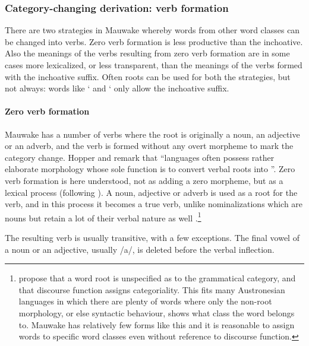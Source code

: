 \subsubsection{Category-changing derivation: verb formation}\label{sec:3.8.2.2}
{}
There are two strategies in Mauwake whereby words from other word classes can be changed into verbs. Zero verb formation is less productive than the inchoative. Also the meanings of the verbs resulting from zero verb formation are in some cases more lexicalized, or less transparent, than the meanings of the verbs formed with the inchoative suffix. Often roots can be used for both the strategies, but not always: words like  ` and  ` only allow the inchoative suffix.

\paragraph{Zero verb formation}\label{sec:3.8.2.2.1}
{}
Mauwake has a number of verbs where the root is originally a noun, an adjective or an adverb, and the verb is formed without any overt morpheme to mark the category change. Hopper and \citet[745]{Thompson1984} remark that ``{languages often possess rather elaborate morphology whose sole function is to convert verbal roots into}  ''. Zero verb formation is here understood, not as adding a zero morpheme, but as a lexical process (following \citealt[224]{Payne1997}). A noun, adjective or adverb is used as a root for the verb, and in this process it becomes a true verb, unlike nominalizations which are nouns but retain a lot of their verbal nature as well \citep[747]{HopperEtAl1984}%
.\footnote{\citet{HopperEtAl1984} propose that a word root is unspecified as to the grammatical category, and that discourse function assigns categoriality. This fits many Austronesian languages in which there are plenty of words where only the non-root morphology, or else syntactic behaviour, shows what class the word belongs to. Mauwake has relatively few forms like this and it is reasonable to assign words to specific word classes even without reference to discourse function.}

The resulting verb is usually transitive, with a few exceptions. The final vowel of a noun or an adjective, usually /a/, is deleted before the verbal inflection. 

